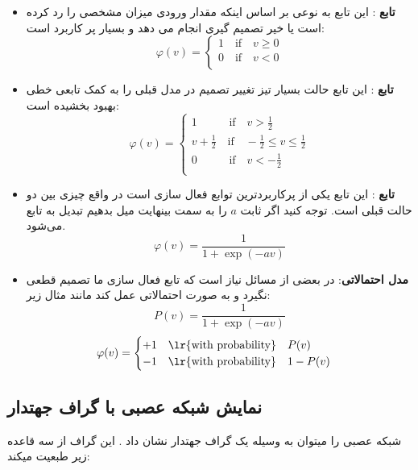\documentclass[11pt,a4paper,twocolumn]{article}
\begin{document}
\begin{itemize}
\item
\textbf{تابع }:
این تابع به نوعی بر اساس اینکه مقدار ورودی میزان مشخصی را رد کرده است یا خیر تصمیم گیری انجام می دهد و بسیار پر کاربرد است:
\[ \varphi(v) =
  \begin{cases}
    1\quad \text{if}\quad v \ge 0\\
    0\quad \text{if}\quad v < 0 \\
  \end{cases}
\]
\item
\textbf{تابع }:
این تابع حالت بسیار تیز تغییر تصمیم در مدل قبلی را به کمک تابعی خطی بهبود بخشیده است:
\[ \varphi(v) =
  \begin{cases}
    1\quad\quad\;\;\;\text{if}\quad v > \frac{1}{2}\\
    v+\frac{1}{2}\quad \text{if}\quad -\frac{1}{2} \le v \le \frac{1}{2} \\
    0\quad\quad\;\;\;\text{if}\quad v < -\frac{1}{2}\\
  \end{cases}
\]

\item
\textbf{تابع }:
این تابع یکی از پرکاربردترین توابع فعال سازی است در واقع چیزی بین دو حالت قبلی است. توجه کنید اگر ثابت $a$ را به سمت بینهایت میل بدهیم تبدیل به تابع
می‌شود.
$$\varphi(v) = \frac{1}{1+\exp(-av)} $$

\item
\textbf{مدل احتمالاتی}:
در بعضی از مسائل نیاز است که تابع فعال سازی ما تصمیم قطعی نگیرد و به صورت احتمالاتی عمل کند مانند مثال زیر:
$$P	(v) = \frac{1}{1+\exp(-av)} $$
\[ \varphi(v) =
  \begin{cases}
    +1 \quad \text{\lr{with probability}} \quad P(v)\\
    -1 \quad \text{\lr{with probability}} \quad 1-P(v)\\
  \end{cases}
\]


\end{itemize}

\subsection{نمایش شبکه عصبی با گراف جهتدار}
 شبکه عصبی را میتوان به وسیله یک گراف جهتدار نشان داد . این گراف از سه قاعده زیر طبعیت میکند:
 
\end{document}
